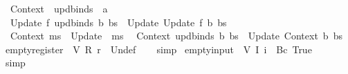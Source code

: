 \begin{isabellebody}
\ \ {\isachardoublequoteopen}{\isacharunderscore}Context{\isachardoublequoteclose}\ {\isacharcolon}{\isacharcolon}\ {\isachardoublequoteopen}updbinds\ {\isasymRightarrow}\ {\isacharprime}a{\isachardoublequoteclose}\ \ \ \ \ \ {\isacharparenleft}{\isachardoublequoteopen}{\isasymlbrakk}{\isacharunderscore}{\isasymrbrakk}{\isachardoublequoteclose}{\isacharparenright}\isanewline
{}\isamarkupfalse%
\isanewline
\ \ {\isachardoublequoteopen}{\isacharunderscore}Update\ f\ {\isacharparenleft}{\isacharunderscore}updbinds\ b\ bs{\isacharparenright}{\isachardoublequoteclose}\ {\isasymrightleftharpoons}\ {\isachardoublequoteopen}{\isacharunderscore}Update\ {\isacharparenleft}{\isacharunderscore}Update\ f\ b{\isacharparenright}\ bs{\isachardoublequoteclose}\isanewline
\ \ {\isachardoublequoteopen}{\isacharunderscore}Context\ ms{\isachardoublequoteclose}\ {\isacharequal}{\isacharequal}\ {\isachardoublequoteopen}{\isacharunderscore}Update\ {\isasymlbrakk}{\isasymrbrakk}\ ms{\isachardoublequoteclose}\isanewline
\ \ {\isachardoublequoteopen}{\isacharunderscore}Context\ {\isacharparenleft}{\isacharunderscore}updbinds\ b\ bs{\isacharparenright}{\isachardoublequoteclose}\ {\isasymrightleftharpoons}\ {\isachardoublequoteopen}{\isacharunderscore}Update\ {\isacharparenleft}{\isacharunderscore}Context\ b{\isacharparenright}\ bs{\isachardoublequoteclose}\isanewline
\isanewline
{}\isamarkupfalse%
\ empty{\isacharunderscore}register{\isacharcolon}\ {\isachardoublequoteopen}{\isasymlbrakk}{\isasymrbrakk}\ {\isacharparenleft}V\ {\isacharparenleft}R\ r{\isacharparenright}{\isacharparenright}\ {\isacharequal}\ {\isacharbraceleft}{\isacharbar}Undef{\isacharbar}{\isacharbraceright}{\isachardoublequoteclose}\isanewline
%
\isadelimproof
\ \ %
\endisadelimproof
%
\isatagproof
{}\isamarkupfalse%
\ {\isacharparenleft}simp{\isacharparenright}%
\endisatagproof
{\isafoldproof}%
%
\isadelimproof
\isanewline
%
\endisadelimproof
\isanewline
{}\isamarkupfalse%
\ empty{\isacharunderscore}input{\isacharcolon}\ {\isachardoublequoteopen}{\isasymlbrakk}{\isasymrbrakk}\ {\isacharparenleft}V\ {\isacharparenleft}I\ i{\isacharparenright}{\isacharparenright}\ {\isacharequal}\ {\isacharbraceleft}{\isacharbar}Bc\ True{\isacharbar}{\isacharbraceright}{\isachardoublequoteclose}\isanewline
%
\isadelimproof
\ \ %
\endisadelimproof
%
\isatagproof
{}\isamarkupfalse%
\ {\isacharparenleft}simp{\isacharparenright}%
\endisatagproof
{\isafoldproof}%
%
\isadelimproof
\isanewline
%
\endisadelimproof
\isanewline
{}\isamarkupfalse%

\end{isabellebody}
